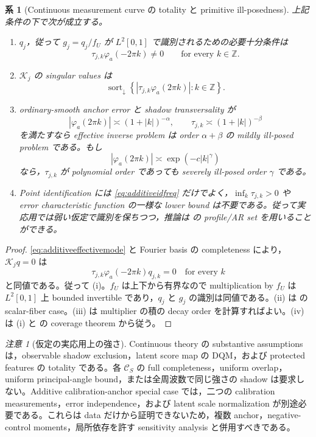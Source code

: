 \documentclass[11pt,a4paper]{ltjsarticle}
\newtheorem{corollary}{系}[section]
\theoremstyle{remark}
\newtheorem{remark}{注意}[section]
\newcommand{\abs}[1]{\left|#1\right|}
\newcommand{\Cop}{\mathscr C}
\newcommand{\Kop}{\mathscr K}
\begin{document}
\begin{corollary}[Continuous measurement curve の totality と primitive ill-posedness]\label{cor:additivefouriertheory}
上記条件の下で次が成立する。
\begin{enumerate}[label=(\roman*)]
\item $q_j$，従って $g_j=q_j/f_U$ が $L^2[0,1]$ で識別されるための必要十分条件は
\begin{equation}
\tau_{j,k}\varphi_a(-2\pi k)\ne0
\qquad\text{for every }k\in\mathbb Z.
\label{eq:additiveidfreq}
\end{equation}
\item $\Kop_j$ の singular values は
\begin{equation}
\operatorname{sort}_{\downarrow}
\left\{
\abs{\tau_{j,k}\varphi_a(2\pi k)}:k\in\mathbb Z
\right\}.
\label{eq:additivesingulars}
\end{equation}
\item ordinary-smooth anchor error と shadow transversality が
\[
\abs{\varphi_a(2\pi k)}\asymp(1+\abs k)^{-\alpha},
\qquad
\tau_{j,k}\asymp(1+\abs k)^{-\beta}
\]
を満たすなら effective inverse problem は order $\alpha+\beta$ の mildly ill-posed problem である。もし
\[
\abs{\varphi_a(2\pi k)}\asymp
\exp(-c\abs k^\gamma)
\]
なら，$\tau_{j,k}$ が polynomial order であっても severely ill-posed order $\gamma$ である。
\item Point identification には \eqref{eq:additiveidfreq} だけでよく，$\inf_k\tau_{j,k}>0$ や error characteristic function の一様な lower bound は不要である。従って実応用では弱い仮定で識別を保ちつつ，推論は  の profile/AR set を用いることができる。
\end{enumerate}
\end{corollary}

\begin{proof}
\eqref{eq:additiveeffectivemode} と Fourier basis の completeness により，$\Kop_jq=0$ は
\[
\tau_{j,k}\varphi_a(-2\pi k)q_{j,k}=0
\quad\text{for every }k
\]
と同値である。従って (i)。$f_U$ は上下から有界なので multiplication by $f_U$ は $L^2[0,1]$ 上 bounded invertible であり，$q_j$ と $g_j$ の識別は同値である。(ii) は  の scalar-fiber case。(iii) は multiplier の積の decay order を計算すればよい。(iv) は (i) と  の coverage theorem から従う。
\end{proof}

\begin{remark}[仮定の実応用上の強さ]\label{rem:continuouspractical}
Continuous theory の substantive assumptions は，observable shadow exclusion，latent score map の DQM，および protected features の totality である。各 $\Cop_S$ の full completeness，uniform overlap，uniform principal-angle bound，または全周波数で同じ強さの shadow は要求しない。Additive calibration-anchor special case では，二つの calibration measurements，error independence，および latent scale normalization が別途必要である。これらは data だけから証明できないため，複数 anchor，negative-control moments，局所依存を許す sensitivity analysis と併用すべきである。
\end{remark}
\end{document}
